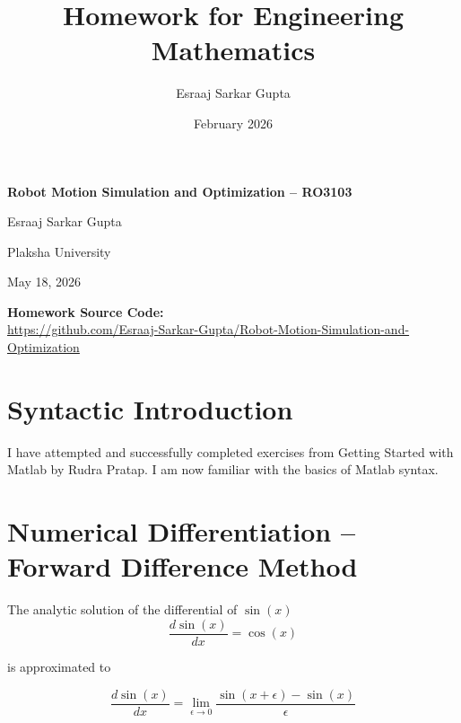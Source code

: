 \documentclass{article}
\title{Homework for Engineering Mathematics}
\author{Esraaj Sarkar Gupta}
\date{February 2026}
\begin{document}
\begin{titlepage}
    \centering
    \vspace*{3cm}
    
    {\Huge \textbf{Robot Motion Simulation and Optimization -- RO3103} \par}
    \vspace{2cm}
    
    {\Large Esraaj Sarkar Gupta \par}
    \vspace{0.5cm}
    
    {\large Plaksha University \par}
    \vspace{2cm}
    
    {\large May 18, 2026 \par}
    
    \vfill
    
    {\large \textbf{Homework Source Code:}\\
    \vspace{0.2cm}
    \url{https://github.com/Esraaj-Sarkar-Gupta/Robot-Motion-Simulation-and-Optimization} \par}
    
    \vspace{2cm}
\end{titlepage}

\section{Syntactic Introduction}

I have attempted and successfully completed exercises from Getting Started with Matlab by Rudra Pratap. I am now familiar with the basics of Matlab syntax.

\section{Numerical Differentiation -- Forward Difference Method}


The analytic solution of the differential of $\sin(x)$
\begin{equation}
    \frac{d\sin(x)}{dx} = \cos(x)
\end{equation}

is approximated to

\begin{equation}
    \frac{d\sin(x)}{dx} = \lim_{\epsilon \xrightarrow{} 0} \frac{\sin{(x + \epsilon)} - \sin(x)}{\epsilon}
\end{equation}
\end{document}
